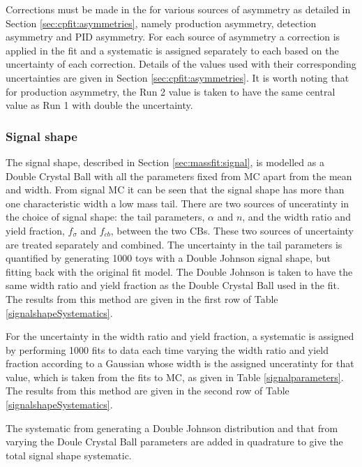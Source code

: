 Corrections must be made in the \CP for various sources of asymmetry as detailed in Section \ref{sec:cpfit:asymmetries}, namely production asymmetry, detection asymmetry and PID asymmetry. For each source of asymmetry a correction is applied in the \CP fit and a systematic is assigned separately to each based on the uncertainty of each correction. Details of the values used with their corresponding uncertainties are given in Section \ref{sec:cpfit:asymmetries}. It is worth noting that for production asymmetry, the Run 2 value is taken to have the same central value as Run 1 with double the uncertainty. 

\subsubsection{Signal shape}
\label{sec:systematics:signal}

The signal shape, described in Section \ref{sec:massfit:signal}, is modelled as a Double Crystal Ball with all the parameters fixed from MC apart from the mean and width. From signal MC it can be seen that the signal shape has more than one characteristic width a low mass tail. There are two sources of unceratinty in the choice of signal shape: the tail parameters, $\alpha$ and $n$, and the width ratio and yield fraction, $f_{\sigma}$ and $f_{cb}$, between the two CBs. These two sources of uncertainty are treated separately and combined. The uncertainty in the tail parameters is quantified by generating 1000 toys with a Double Johnson signal shape, but fitting back with the original fit model. The Double Johnson is taken to have the same width ratio and yield fraction as the Double Crystal Ball used in the \CP fit. The results from this method are given in the first row of Table \ref{signalshapeSystematics}.

For the uncertainty in the width ratio and yield fraction, a systematic is assigned by performing 1000 fits to data each time varying the width ratio and yield fraction according to a Gaussian whose width is the assigned unceratinty for that value, which is taken from the fits to MC, as given in Table \ref{signalparameters}. The results from this method are given in the second row of Table \ref{signalshapeSystematics}.

The systematic from generating a Double Johnson distribution and that from varying the Doule Crystal Ball parameters are added in quadrature to give the total signal shape systematic.

